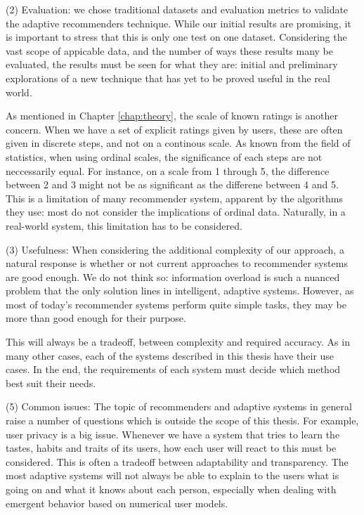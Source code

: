 (2) Evaluation: we chose traditional datasets and evaluation metrics
to validate the adaptive recommenders technique.
While our initial results are promising, it is important to stress
that this is only one test on one dataset. Considering the vast scope
of appicable data, and the number of ways these results many be 
evaluated, the results must be seen for what they are:
initial and preliminary explorations of a new technique
that has yet to be proved useful in the real world.

As mentioned in Chapter \ref{chap:theory}, the scale of known ratings is another concern.
When we have a set of explicit ratings given by users, these are often
given in discrete steps, and not on a continous scale.
As known from the field of statistics, when using ordinal scales,
the significance of each steps are not neccessarily equal.
For instance, on a scale from 1 through 5, the difference
between 2 and 3 might not be as significant as the differene between 4 and 5.
This is a limitation of many recommender system, apparent by the algorithms they use:
most do not consider the implications of ordinal data.
Naturally, in a real-world system, this limitation has to be considered.

(3) Usefulness:
When considering the additional complexity of our approach,
a natural response is whether or not current approaches
to recommender systems are good enough.
We do not think so: information overload is such a nuanced problem 
that the only solution lines in intelligent, adaptive systems.
However, as most of today's recommender systems 
perform quite simple tasks, they may be more
than good enough for their purpose.

This will always be a tradeoff, between complexity and required accuracy.
As in many other cases, each of the systems described in this thesis
have their use cases. In the end, the requirements of each system
must decide which method best suit their needs.

(5) Common issues:
The topic of recommenders and adaptive systems in general
raise a number of questions which is outside the scope of this thesis.
For example, user privacy is a big issue.
Whenever we have a system that tries to learn the tastes, habits and
traits of its users, how each user will react to this must be considered.
This is often a tradeoff between adaptability and transparency.
The most adaptive systems will not always be able to explain to the users
what is going on and what it knows about each person,
especially when dealing with emergent behavior based on 
numerical user models.

